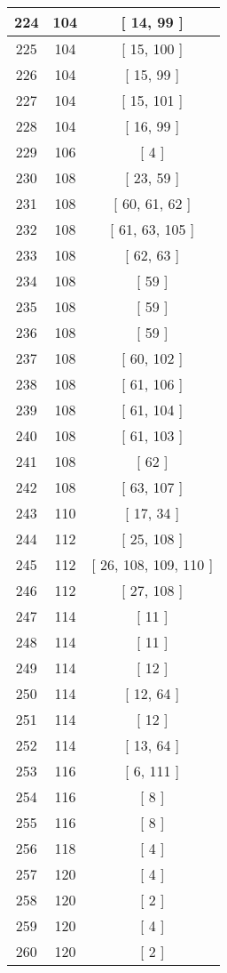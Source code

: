 \begin{center}
\begin{longtable}[H]{|| c c c ||}
224 & 104 & [ 14, 99 ]
\\\hline
225 & 104 & [ 15, 100 ]
\\\hline
226 & 104 & [ 15, 99 ]
\\\hline
227 & 104 & [ 15, 101 ]
\\\hline
228 & 104 & [ 16, 99 ]
\\\hline
229 & 106 & [ 4 ]
\\\hline
230 & 108 & [ 23, 59 ]
\\\hline
231 & 108 & [ 60, 61, 62 ]
\\\hline
232 & 108 & [ 61, 63, 105 ]
\\\hline
233 & 108 & [ 62, 63 ]
\\\hline
234 & 108 & [ 59 ]
\\\hline
235 & 108 & [ 59 ]
\\\hline
236 & 108 & [ 59 ]
\\\hline
237 & 108 & [ 60, 102 ]
\\\hline
238 & 108 & [ 61, 106 ]
\\\hline
239 & 108 & [ 61, 104 ]
\\\hline
240 & 108 & [ 61, 103 ]
\\\hline
241 & 108 & [ 62 ]
\\\hline
242 & 108 & [ 63, 107 ]
\\\hline
243 & 110 & [ 17, 34 ]
\\\hline
244 & 112 & [ 25, 108 ]
\\\hline
245 & 112 & [ 26, 108, 109, 110 ]
\\\hline
246 & 112 & [ 27, 108 ]
\\\hline
247 & 114 & [ 11 ]
\\\hline
248 & 114 & [ 11 ]
\\\hline
249 & 114 & [ 12 ]
\\\hline
250 & 114 & [ 12, 64 ]
\\\hline
251 & 114 & [ 12 ]
\\\hline
252 & 114 & [ 13, 64 ]
\\\hline
253 & 116 & [ 6, 111 ]
\\\hline
254 & 116 & [ 8 ]
\\\hline
255 & 116 & [ 8 ]
\\\hline
256 & 118 & [ 4 ]
\\\hline
257 & 120 & [ 4 ]
\\\hline
258 & 120 & [ 2 ]
\\\hline
259 & 120 & [ 4 ]
\\\hline
260 & 120 & [ 2 ]
\\\hline

\end{longtable}
\end{center}
